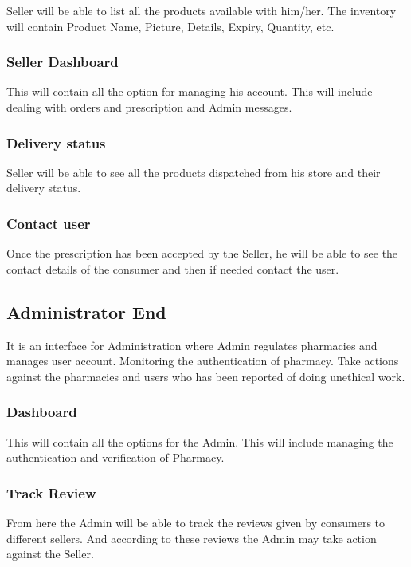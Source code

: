 \documentclass[fleqn,10pt]{../SelfArx} %
\begin{document}
Seller will be able to list all the products available with him/her. The inventory will contain Product Name, Picture, Details, Expiry, Quantity, etc.
\subsubsection{Seller Dashboard}

This will contain all the option for managing his account. This will include dealing with orders and prescription and Admin messages.

\subsubsection{Delivery status}
Seller will be able to see all the products dispatched from his store and their delivery status.
\subsubsection{Contact user}
Once the prescription has been accepted by the Seller, he will be able to see the contact details of the consumer and then if needed contact the user.
\subsection{Administrator End}
It is an interface for Administration where Admin regulates pharmacies and manages user account. Monitoring the authentication of pharmacy.
Take actions against the pharmacies and users who has been reported of doing unethical work.
\subsubsection{Dashboard}
This will contain all the options for the Admin. This will include managing the authentication and verification of Pharmacy.
\subsubsection{Track Review}
From here the Admin will be able to track the reviews given by consumers to different sellers. And according to these reviews the Admin may take action against the Seller.
\end{document}

